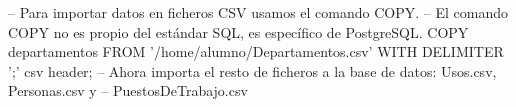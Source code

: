 \lstset{caption=Ejemplo de COPY,label=sql:copy}
\begin{SQL}
-- Para importar datos en ficheros CSV usamos el comando COPY.
-- El comando COPY no es propio del estándar SQL, es específico de PostgreSQL.
COPY departamentos FROM '/home/alumno/Departamentos.csv' WITH DELIMITER ';' csv header;
-- Ahora importa el resto de ficheros a la base de datos: Usos.csv, Personas.csv y
-- PuestosDeTrabajo.csv
\end{SQL}
